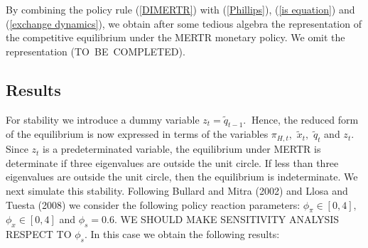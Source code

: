 \documentclass{article}
\begin{document}
By combining the policy rule (\ref{DIMERTR}) with (\ref{Phillips}), (\ref{is
equation}) and (\ref{exchange dynamics}), we obtain after some tedious
algebra the representation of the competitive equilibrium under the MERTR
monetary policy. We omit the representation (TO\ BE\ COMPLETED).

\subsection{Results}

For stability we introduce a dummy variable $z_{t}=\widetilde{q}_{t-1}.\ $%
Hence, the reduced form of the equilibrium is now expressed in terms of the
variables $\pi _{H,t},$ $\widetilde{x}_{t},$ $\widetilde{q}_{t}$ and $z_{t}.$
Since $z_{t}$ is a predeterminated variable, the equilibrium under MERTR is
determinate if three eigenvalues are outside the unit circle. If less than
three eigenvalues are outside the unit circle, then the equilibrium is
indeterminate. We next simulate this stability. Following Bullard and Mitra
(2002) and Llosa and Tuesta (2008) we consider the following policy reaction
parameters: $\phi _{\pi }\in \left[ 0,4\right] ,$ $\phi _{x}\in \left[ 0,4%
\right] $ and $\phi _{s}=0.6$. WE SHOULD MAKE SENSITIVITY ANALYSIS RESPECT
TO $\phi _{s}.$ In this case we obtain the following results:
\end{document}
